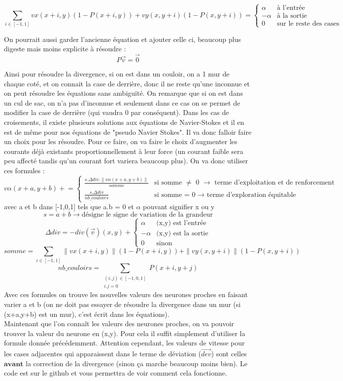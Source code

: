 \documentclass[10pt]{article}
\newcommand{\pluseq}{\mathrel{+}=}
\begin{document}
\[ \sum_{i\in[-1,1]}vx(x+i,y)(1-P(x+i,y))+vy(x,y+i)(1-P(x,y+i)) = 
\begin{cases}
	\alpha & \text{à l'entrée} \\
	-\alpha & \text{à la sortie} \\
	0 & \text{sur le reste des cases}
\end{cases}
\] 

On pourrait aussi garder l'ancienne équation et ajouter celle ci, beaucoup plus digeste mais moins explicite à résoudre :
\[P\overrightarrow{v} = \overrightarrow{0} \]

Ainsi pour résoudre la divergence, si on est dans un couloir, on a 1 mur de chaque coté, et on connait la case de derrière, donc il ne reste qu'une inconnue et on peut résoudre les équations sans ambiguïté. On remarque que si on est dans un cul de sac, on n'a pas d'inconnue et seulement dans ce cas on se permet de modifier la case de derrière (qui vaudra 0 par conséquent). Dans les cas de croisements, il existe plusieurs solutions aux équations de Navier-Stokes et il en est de même pour nos équations de "pseudo Navier Stokes". Il va donc falloir faire un choix pour les résoudre. Pour ce faire, on va faire le choix d'augmenter les courants déjà existants proportionnellement à leur force (un courant faible sera peu affecté tandis qu'un courant fort variera beaucoup plus). On va donc utiliser ces formules :
\[v\alpha(x+a,y+b) \pluseq 
\begin{cases}
	\frac{s.\Delta div.\|v\alpha(x+a,y+b)\|}{somme} & \text{si somme $\neq$ 0 $\rightarrow$ terme d'exploitation et de renforcement} \\
	\frac{s.\Delta div}{nb\_couloirs} & \text{si somme = 0 $\rightarrow$ terme d'exploration équitable}
\end{cases}
\]
avec a et b dans [-1,0,1] tels que a.b = 0 et $\alpha$ pouvant signifier x ou y
\[s = a+b \rightarrow\text{désigne le signe de variation de la grandeur}\]
\[\Delta div = - div(\overrightarrow{v})(x,y) +
\begin{cases}
	\alpha & \text{(x,y) est l'entrée} \\
	-\alpha & \text{(x,y) est la sortie} \\
	0 & \text{sinon}
\end{cases}
\]
\[somme = \sum_{i\in[-1,1]}\|vx(x+i,y)\|(1-P(x+i,y))+\|vy(x,y+i)\|(1-P(x,y+i)) \]
\[nb\_couloirs = \sum_{\substack{(i,j)\in[-1,0,1]\\i.j=0}}{P(x+i,y+j)}\]
Avec ces formules on trouve les nouvelles valeurs des neurones proches en faisant varier a et b (on ne doit pas essayer de résoudre la divergence dans un mur (si (x+a,y+b) est un mur), c'est écrit dans les équations). \\
Maintenant que l'on connaît les valeurs des neurones proches, on va pouvoir trouver la valeur du neurone en (x,y). Pour cela il suffit simplement d'utiliser la formule donnée précédemment. Attention cependant, les valeurs de vitesse pour les cases adjacentes qui apparaissent dans le terme de déviation ($\overrightarrow{dev}$) sont celles $\textbf{avant}$ la correction de la divergence (sinon ça marche beaucoup moins bien).
Le code est sur le github et vous permettra de voir comment cela fonctionne.
\end{document}
